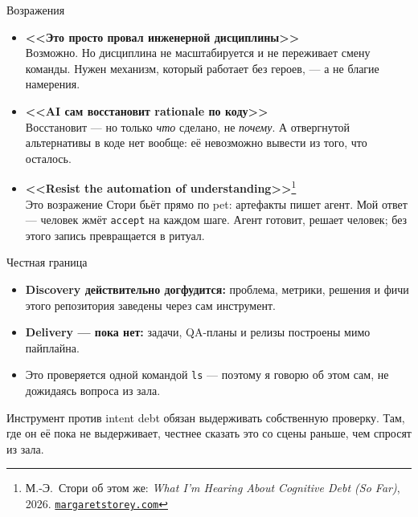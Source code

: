 \documentclass[11pt, aspectratio=169]{beamer}
\begin{document}
\begin{frame}{Возражения}
  \vspace{0.25cm}
  \begin{itemize}
    \setlength\itemsep{0.5em}
    \small
    \item \textbf{<<Это просто провал инженерной дисциплины>>}\\
          \footnotesize Возможно. Но дисциплина не масштабируется и не переживает
          смену команды. Нужен механизм, который работает без героев, ---
          а не благие намерения.

    \item \textbf{<<AI сам восстановит rationale по коду>>}\\
          \footnotesize Восстановит --- но только \emph{что} сделано, не \emph{почему}.
          А отвергнутой альтернативы в коде нет вообще: её невозможно вывести
          из того, что осталось.

    \item \textbf{<<Resist the automation of understanding>>}\footnote{М.-Э.\ Стори
          об этом же: \textit{What I'm Hearing About Cognitive Debt (So Far)},
          2026. \href{https://margaretstorey.com/blog/2026/02/18/cognitive-debt-revisited/}{\texttt{margaretstorey.com}}}\\
          \footnotesize Это возражение Стори бьёт прямо по pet: артефакты пишет агент.
          Мой ответ --- человек жмёт \texttt{accept} на каждом шаге. Агент готовит,
          решает человек; без этого запись превращается в ритуал.
  \end{itemize}
\end{frame}

\begin{frame}{Честная граница}
  \vspace{0.3cm}
  \begin{itemize}
    \setlength\itemsep{0.45em}
    \item \textbf{Discovery действительно догфудится:} проблема, метрики,
          решения и фичи этого репозитория заведены через сам инструмент.
    \item \textbf{Delivery --- пока нет:} задачи, QA-планы и релизы
          построены мимо пайплайна.
    \item Это проверяется одной командой \texttt{ls} --- поэтому я говорю
          об этом сам, не дожидаясь вопроса из зала.
  \end{itemize}

  \vspace{0.5cm}
  \begin{center}
  \begin{minipage}{0.9\textwidth}
  \footnotesize\textcolor{mutedText}{%
  Инструмент против intent debt обязан выдерживать собственную проверку.
  Там, где он её пока не выдерживает, честнее сказать это со сцены раньше,
  чем спросят из зала.}
  \end{minipage}
  \end{center}
\end{frame}
\end{document}
